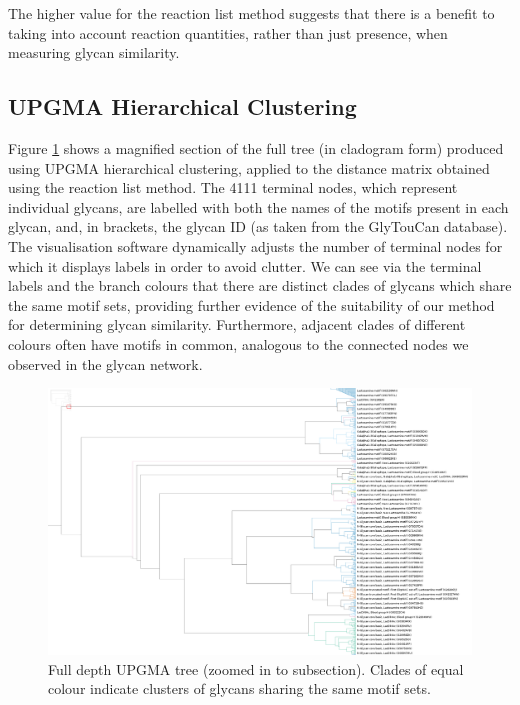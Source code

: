 \documentclass[12pt,a4paper]{article}
\begin{document}
The higher value for the reaction list method suggests that there is a benefit to taking into account reaction quantities, rather than just presence, when measuring glycan similarity.

\subsection{UPGMA Hierarchical Clustering}
\label{sec:clustering_results}

Figure \ref{fig:full_tree_zoomed} shows a magnified section of the full tree (in cladogram form) produced using UPGMA hierarchical clustering, applied to the distance matrix obtained using the reaction list method. The 4111 terminal nodes, which represent individual glycans, are labelled with both the names of the motifs present in each glycan, and, in brackets, the glycan ID (as taken from the GlyTouCan database). The visualisation software dynamically adjusts the number of terminal nodes for which it displays labels in order to avoid clutter. We can see via the terminal labels and the branch colours that there are distinct clades of glycans which share the same motif sets, providing further evidence of the suitability of our method for determining glycan similarity. Furthermore, adjacent clades of different colours often have motifs in common, analogous to the connected nodes we observed in the glycan network.

\begin{figure}
\centering 
\includegraphics[scale=0.3]{trees/zoomed_full_tree_cladogram.png} 
\caption{Full depth UPGMA tree (zoomed in to subsection). Clades of equal colour indicate clusters of glycans sharing the same motif sets.}
\label{fig:full_tree_zoomed}
\end{figure}
\clearpage
\end{document}
